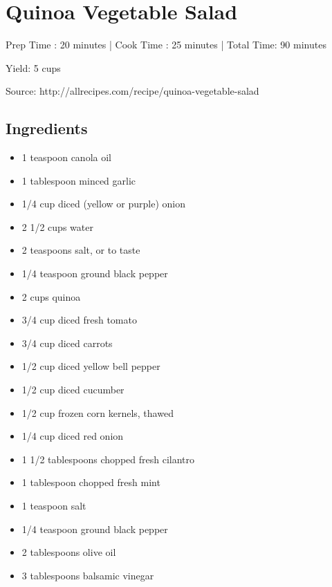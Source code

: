 \section{Quinoa Vegetable Salad}

\begin{center}
Prep Time : 20 minutes |
Cook Time : 25 minutes |
\noindent Total Time: 90 minutes

\noindent Yield: 5 cups

\vspace{1em}

Source: http://allrecipes.com/recipe/quinoa-vegetable-salad
\end{center}

\subsection{Ingredients}
\begin{multicols}{2}
\begin{itemize}
    \item 1 teaspoon canola oil
    \item 1 tablespoon minced garlic
    \item 1/4 cup diced (yellow or purple) onion
    \item 2 1/2 cups water
    \item 2 teaspoons salt, or to taste
    \item 1/4 teaspoon ground black pepper
    \item 2 cups quinoa
    \item 3/4 cup diced fresh tomato
    \item 3/4 cup diced carrots
    \item 1/2 cup diced yellow bell pepper
    \item 1/2 cup diced cucumber
    \item 1/2 cup frozen corn kernels, thawed
    \item 1/4 cup diced red onion
    \item 1 1/2 tablespoons chopped fresh cilantro
    \item 1 tablespoon chopped fresh mint
    \item 1 teaspoon salt
    \item 1/4 teaspoon ground black pepper
    \item 2 tablespoons olive oil
    \item 3 tablespoons balsamic vinegar
\end{itemize}
\end{multicols}

